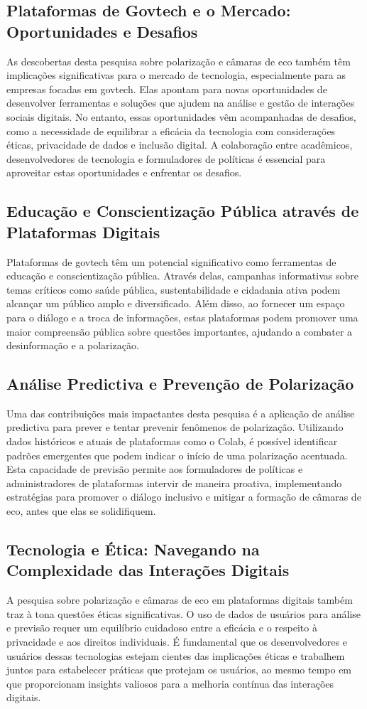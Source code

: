 \subsection*{Plataformas de Govtech e o Mercado: Oportunidades e Desafios}
As descobertas desta pesquisa sobre polarização e câmaras de eco também têm implicações significativas para o mercado de tecnologia, especialmente para as empresas focadas em govtech. Elas apontam para novas oportunidades de desenvolver ferramentas e soluções que ajudem na análise e gestão de interações sociais digitais. No entanto, essas oportunidades vêm acompanhadas de desafios, como a necessidade de equilibrar a eficácia da tecnologia com considerações éticas, privacidade de dados e inclusão digital. A colaboração entre acadêmicos, desenvolvedores de tecnologia e formuladores de políticas é essencial para aproveitar estas oportunidades e enfrentar os desafios.

\subsection*{Educação e Conscientização Pública através de Plataformas Digitais}
Plataformas de govtech têm um potencial significativo como ferramentas de educação e conscientização pública. Através delas, campanhas informativas sobre temas críticos como saúde pública, sustentabilidade e cidadania ativa podem alcançar um público amplo e diversificado. Além disso, ao fornecer um espaço para o diálogo e a troca de informações, estas plataformas podem promover uma maior compreensão pública sobre questões importantes, ajudando a combater a desinformação e a polarização.

\subsection*{Análise Predictiva e Prevenção de Polarização}
Uma das contribuições mais impactantes desta pesquisa é a aplicação de análise predictiva para prever e tentar prevenir fenômenos de polarização. Utilizando dados históricos e atuais de plataformas como o Colab, é possível identificar padrões emergentes que podem indicar o início de uma polarização acentuada. Esta capacidade de previsão permite aos formuladores de políticas e administradores de plataformas intervir de maneira proativa, implementando estratégias para promover o diálogo inclusivo e mitigar a formação de câmaras de eco, antes que elas se solidifiquem.

\subsection*{Tecnologia e Ética: Navegando na Complexidade das Interações Digitais}
A pesquisa sobre polarização e câmaras de eco em plataformas digitais também traz à tona questões éticas significativas. O uso de dados de usuários para análise e previsão requer um equilíbrio cuidadoso entre a eficácia e o respeito à privacidade e aos direitos individuais. É fundamental que os desenvolvedores e usuários dessas tecnologias estejam cientes das implicações éticas e trabalhem juntos para estabelecer práticas que protejam os usuários, ao mesmo tempo em que proporcionam insights valiosos para a melhoria contínua das interações digitais.

